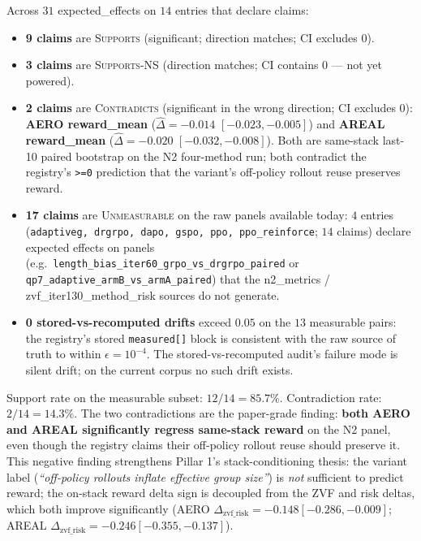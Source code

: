 Across $31$ expected\_effects on $14$ entries that declare claims:
\begin{itemize}
  \item \textbf{9 claims} are \textsc{Supports} (significant; direction
    matches; CI excludes 0).
  \item \textbf{3 claims} are \textsc{Supports-NS} (direction matches;
    CI contains 0 --- not yet powered).
  \item \textbf{2 claims} are \textsc{Contradicts} (significant in the
    wrong direction; CI excludes 0): \textbf{AERO reward\_mean}
    ($\hat\Delta=-0.014$ $[-0.023,-0.005]$) and \textbf{AREAL
    reward\_mean} ($\hat\Delta=-0.020$ $[-0.032,-0.008]$). Both are
    same-stack last-10 paired bootstrap on the N2 four-method run; both
    contradict the registry's \texttt{>=0} prediction that the variant's
    off-policy rollout reuse preserves reward.
  \item \textbf{17 claims} are \textsc{Unmeasurable} on the raw panels
    available today: $4$ entries
    (\texttt{adaptiveg, drgrpo, dapo, gspo, ppo, ppo\_reinforce}; $14$
    claims) declare expected effects on panels (e.g.\
    \texttt{length\_bias\_iter60\_grpo\_vs\_drgrpo\_paired} or
    \texttt{qp7\_adaptive\_armB\_vs\_armA\_paired}) that the
    n2\_metrics / zvf\_iter130\_method\_risk sources do not generate.
  \item \textbf{0 stored-vs-recomputed drifts} exceed $0.05$ on the $13$
    measurable pairs: the registry's stored \texttt{measured[]} block is
    consistent with the raw source of truth to within
    $\epsilon{=}10^{-4}$. The stored-vs-recomputed audit's failure mode
    is silent drift; on the current corpus no such drift exists.
\end{itemize}

Support rate on the measurable subset: $12/14 = 85.7\%$. Contradiction
rate: $2/14 = 14.3\%$. The two contradictions are the paper-grade
finding: \textbf{both AERO and AREAL significantly regress same-stack
reward} on the N2 panel, even though the registry claims their
off-policy rollout reuse should preserve it. This negative finding
strengthens Pillar 1's stack-conditioning thesis: the variant label
(\textit{``off-policy rollouts inflate effective group size''}) is
\emph{not} sufficient to predict reward; the on-stack reward delta
sign is decoupled from the ZVF and risk deltas, which both improve
significantly (AERO $\Delta_{\text{zvf\_risk}}=-0.148 [-0.286,-0.009]$;
AREAL $\Delta_{\text{zvf\_risk}}=-0.246 [-0.355,-0.137]$).

